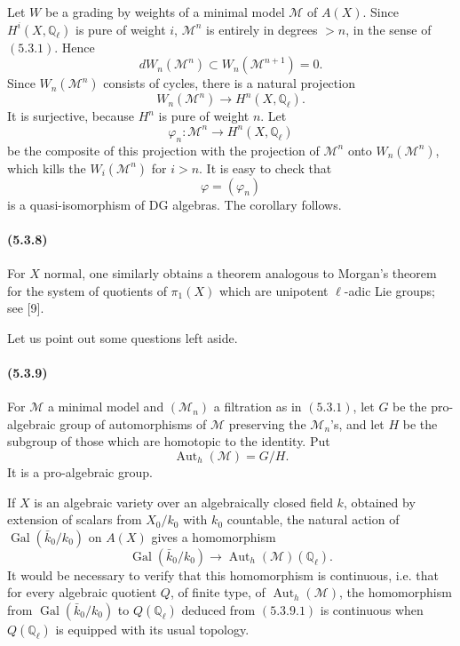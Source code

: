 \documentclass[11pt]{article}
\theoremstyle{remark}
\newcommand{\Ql}{\mathbb{Q}_\ell}
\begin{document}
Let \(W\) be a grading by weights of a minimal model \(\mathcal M\) of \(A(X)\).  Since \(H^i(X,\Ql)\) is pure of weight \(i\), \(\mathcal M^n\) is entirely in degrees \(>n\), in the sense of \((5.3.1)\).  Hence
\[
dW_n(\mathcal M^n)\subset W_n(\mathcal M^{n+1})=0.
\]
Since \(W_n(\mathcal M^n)\) consists of cycles, there is a natural projection
\[
W_n(\mathcal M^n)\longrightarrow H^n(X,\Ql).
\]
It is surjective, because \(H^n\) is pure of weight \(n\).  Let
\[
\varphi_n:\mathcal M^n\longrightarrow H^n(X,\Ql)
\]
be the composite of this projection with the projection of \(\mathcal M^n\) onto \(W_n(\mathcal M^n)\), which kills the \(W_i(\mathcal M^n)\) for \(i>n\).  It is easy to check that
\[
\varphi=(\varphi_n)
\]
is a quasi-isomorphism of DG algebras.  The corollary follows.

\paragraph{(5.3.8)}
For \(X\) normal, one similarly obtains a theorem analogous to Morgan's theorem for the system of quotients of \(\pi_1(X)\) which are unipotent \(\ell\)-adic Lie groups; see [9].

Let us point out some questions left aside.

\paragraph{(5.3.9)}
For \(\mathcal M\) a minimal model and \((\mathcal M_n)\) a filtration as in \((5.3.1)\), let \(G\) be the pro-algebraic group of automorphisms of \(\mathcal M\) preserving the \(\mathcal M_n\)'s, and let \(H\) be the subgroup of those which are homotopic to the identity.  Put
\[
\operatorname{Aut}_h(\mathcal M)=G/H.
\]
It is a pro-algebraic group.

If \(X\) is an algebraic variety over an algebraically closed field \(k\), obtained by extension of scalars from \(X_0/k_0\) with \(k_0\) countable, the natural action of \(\operatorname{Gal}(\bar k_0/k_0)\) on \(A(X)\) gives a homomorphism
\[
\operatorname{Gal}(\bar k_0/k_0)\longrightarrow
\operatorname{Aut}_h(\mathcal M)(\Ql). \tag{5.3.9.1}
\]
It would be necessary to verify that this homomorphism is continuous, i.e. that for every algebraic quotient \(Q\), of finite type, of \(\operatorname{Aut}_h(\mathcal M)\), the homomorphism from \(\operatorname{Gal}(\bar k_0/k_0)\) to \(Q(\Ql)\) deduced from \((5.3.9.1)\) is continuous when \(Q(\Ql)\) is equipped with its usual topology.
\end{document}
